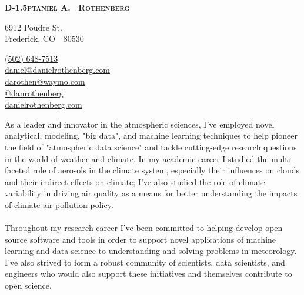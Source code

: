 \documentclass[11pt,letterpaper]{article}
\makeatletter
\def\myemail{daniel@danielrothenberg.com}
\def\myworkemail{darothen@waymo.com}
\def\mytwitter{danrothenberg}
\def\mywebsite{http://www.danielrothenberg.com}
\def\mywebsiteshort{danielrothenberg.com}
\def\myphone{(502) 648-7513}
\newcommand{\mhead}[1]{\leavevmode\marginpar{\sffamily\footnotesize #1}}
\makeatother
\begin{document}
\pagestyle{fancy} \setlength\headwidth{6.5in}
 \cfoot{}
\thispagestyle{empty}
\begin{adjustwidth}{-1in}{}
{\Large\textbf{
  {\textsc{%
    {D}\kern-1.5ptaniel
    {A}\kern-2pt.~%
    {R}othenberg}
  }
 }
}
\hfill\hfill\hfill
{\small
  \begin{minipage}[b]{1.5in}
    \flushleft \footnotesize
    6912 Poudre St. \\
    Frederick, CO~~80530
  \end{minipage}
  \hfill
  \begin{minipage}[b]{1.9in}
    \flushright \footnotesize
    \href{tel:\myphone}{\myphone}~\faPhone \\
    \href{mailto:\myemail}{\myemail} ~\faEnvelope \\
    \href{mailto:\myworkemail}{\myworkemail} ~\faEnvelope \\
    \href{https://www.twitter.com/\mytwitter}{@\mytwitter} ~\faTwitter \\
    \href{\mywebsite}{\mywebsiteshort} ~\faGlobe %
  \end{minipage}
}\par
\hrulefill
\end{adjustwidth}
\reversemarginpar
\setlength\marginparwidth{0.85in}




\mhead{Research \newline Interests}

As a leader and innovator in the atmospheric sciences, I've employed novel
analytical, modeling, "big data", and machine learning techniques to help
pioneer the field of "atmospheric data science" and tackle cutting-edge
research questions in the world of weather and climate. In my academic 
career I studied the multi-faceted role of aerosols in the climate system,
especially their influences on clouds and their indirect effects on climate;
I've also studied the role of climate variability in driving air quality 
as a means for better understanding the impacts of climate air pollution 
policy. \\ \\
Throughout my research career I've been committed to helping develop open 
source software and tools in order to support novel applications of machine
learning and data science to understanding and solving problems in meteorology.
I've also strived to form a robust community of scientists, data scientists,
and engineers who would also support these initiatives and themselves 
contribute to open science.
\end{document}

